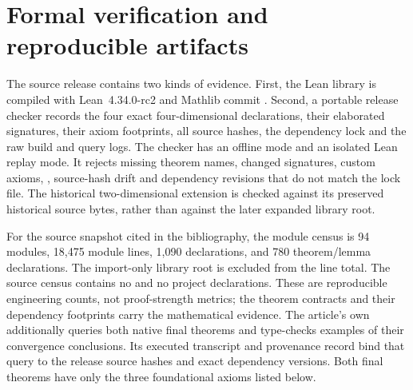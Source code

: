 \section{Formal verification and reproducible artifacts}\label{sec:verification}
The source release contains two kinds of evidence. First, the Lean library is
compiled with Lean~4.34.0-rc2 and Mathlib commit
. Second, a portable release
checker records the four exact four-dimensional declarations, their elaborated
signatures, their axiom footprints, all source hashes, the dependency lock and
the raw build and query logs. The checker has an offline mode and an isolated
Lean replay mode. It rejects missing theorem names, changed signatures,
custom axioms, , source-hash drift and dependency revisions that
do not match the lock file. The historical two-dimensional extension is
checked against its preserved historical source bytes, rather than against
the later expanded library root.

For the source snapshot cited in the bibliography, the module census is
94 modules, 18,475 module lines, 1,090 declarations, and 780 theorem/lemma
declarations. The import-only library root is excluded from the line total.
The source census contains no  and no project 
declarations. These are reproducible engineering counts, not proof-strength
metrics; the theorem contracts and their dependency footprints carry the
mathematical evidence. The article's own
 additionally queries both native final
theorems and type-checks examples of their convergence conclusions.
Its executed transcript  and provenance record
 bind that query to the release source hashes
and exact dependency versions. Both final theorems have only the three
foundational axioms listed below.

